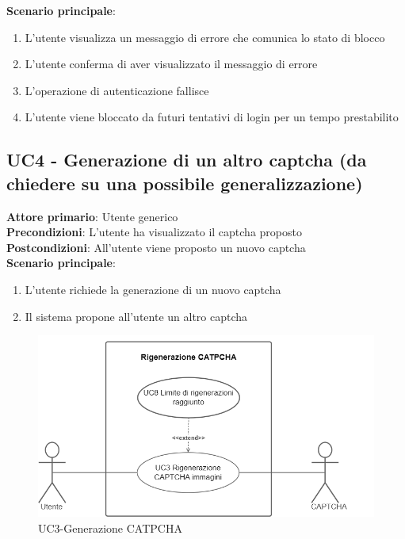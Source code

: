 \textbf{Scenario principale}:
\begin{enumerate}
   \item L'utente visualizza un messaggio di errore che comunica lo stato di blocco
   \item L'utente conferma di aver visualizzato il messaggio di errore
   \item L'operazione di autenticazione fallisce
   \item L'utente viene bloccato da futuri tentativi di login per un tempo prestabilito
\end{enumerate}

\subsection{UC4 - Generazione di un altro captcha (da chiedere su una possibile generalizzazione)}
\textbf{Attore primario}: Utente generico\\
\textbf{Precondizioni}: L'utente ha visualizzato il captcha proposto\\
\textbf{Postcondizioni}: All'utente viene proposto un nuovo captcha\\

\textbf{Scenario principale}:
\begin{enumerate}
   \item L'utente richiede la generazione di un nuovo captcha
   \item Il sistema propone all'utente un altro captcha
\end{enumerate}

\begin{figure}[H]
    \centering
    \includegraphics[scale=0.6]{img/Generazione_catpcha.png}
    \caption{UC3-Generazione CATPCHA}
\end{figure}